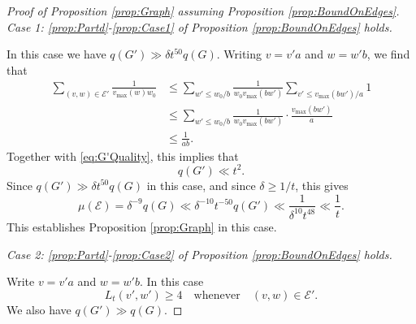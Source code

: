 \documentclass[12pt]{amsart}
\numberwithin{equation}{section}
\theoremstyle{definition}
\theoremstyle{remark}
\newcommand{\CE}{\mathcal{E}}
\renewcommand{\le}{\leqslant}
\renewcommand{\ge}{\geqslant}
\begin{document}
\begin{proof}[Proof of Proposition \ref{prop:Graph} assuming Proposition \ref{prop:BoundOnEdges}]
\bigskip

\noindent
\textit{Case 1: \ref{prop:Partd}-\ref{prop:Case1} of Proposition \ref{prop:BoundOnEdges} holds.}

\medskip

In this case we have $q(G')\gg \delta t^{50} q(G)$. 
Writing $v=v' a$ and $w=w' b$, we find that
\begin{align*}
\sum_{(v,w)\in\CE'} \frac{1}{v_{\max}(w) w_0}
&\le \sum_{w'\le w_0/b}\frac{1}{ w_0 v_{\max}(b w')}
	\sum_{v'\le v_{\max}(b w')/a}1\\
&\le \sum_{w'\le w_0/b}\frac{1}{ w_0 v_{\max}(b w')}\cdot \frac{v_{\max}(bw')}{a} \\
&\le \frac{1}{ab} .
\end{align*}
Together with \eqref{eq:G'Quality}, this implies that
\[
q(G')\ll t^2.
\]
Since $q(G')\gg \delta t^{50} q(G)$ in this case, and since $\delta \ge 1/t$, this gives
\[
\mu(\CE)  = \delta^{-9}q(G) \ll \delta^{-10}t^{-50}q(G')\ll \frac{1}{\delta^{10}t^{48}} \ll \frac{1}{t} .
\]
This establishes Proposition \ref{prop:Graph} in this case.

\bigskip

\noindent
\textit{Case 2: \ref{prop:Partd}-\ref{prop:Case2} of Proposition \ref{prop:BoundOnEdges} holds.}

\medskip


Write $v=v' a$ and $w=w' b$. In this case 
\begin{equation}
	\label{eq:L_t-lowerbound}
	L_t(v',w')\ge 4\quad\text{whenever}\quad(v,w)\in\CE'.
\end{equation}
We also have $q(G')\gg q(G)$. 


\end{proof}
\end{document}
